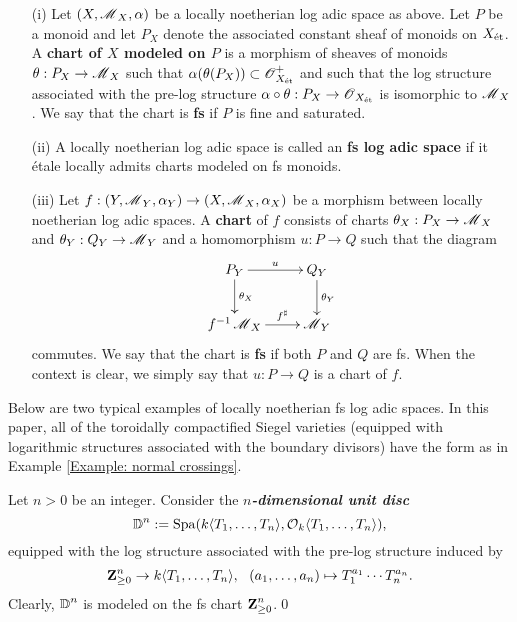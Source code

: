 \begin{Definition}
\begin{enumerate}
\item[(i)] Let $(X, \operatorname{\mathscr{M}}_{X}, \alpha)$ be a locally noetherian log adic space as above. Let $P$ be a monoid and let $P_{X}$ denote the associated constant sheaf of monoids on $X_{\operatorname{\textrm{\'{e}t}}}$. A \textbf{chart of $X$ modeled on $P$} is a morphism of sheaves of monoids $\theta: P_{X}\rightarrow \operatorname{\mathscr{M}}_{X}$ such that $\alpha(\theta(P_{X}))\subset \operatorname{\mathscr{O}}^+_{X_{\operatorname{\textrm{\'{e}t}}}}$ and such that the log structure associated with the pre-log structure $\alpha\circ\theta:P_{X}\rightarrow \operatorname{\mathscr{O}}_{X_{\operatorname{\textrm{\'{e}t}}}}$ is isomorphic to $\operatorname{\mathscr{M}}_{X}$. We say that the chart is \textbf{fs} if $P$ is fine and saturated. 
\item[(ii)] A locally noetherian log adic space is called an \textbf{fs log adic space} if it \'etale locally admits charts modeled on fs monoids.
\item[(iii)] Let $f: (Y, \operatorname{\mathscr{M}}_{Y}, \alpha_{Y})\rightarrow (X, \operatorname{\mathscr{M}}_{X}, \alpha_{X})$ be a morphism between locally noetherian log adic spaces. A \textbf{chart} of $f$ consists of charts $\theta_{X}:P_{X}\rightarrow \operatorname{\mathscr{M}}_{X}$ and $\theta_{Y}: Q_{Y}\rightarrow \operatorname{\mathscr{M}}_{Y}$ and a homomorphism $u:P\rightarrow Q$ such that the diagram
 \[
        \xymatrix{ {P_{Y}} \ar^-u[r] \ar^-{\theta_{X}}[d] & {Q_{Y}} \ar^-{\theta_{Y}}[d] \\
        {f^{-1}\scrM_{X}} \ar^-{f^\sharp}[r] & {\scrM_{Y}} }
    \]
commutes. We say that the chart is \textbf{fs} if both $P$ and $Q$ are fs. When the context is clear, we simply say that $u:P\rightarrow Q$ is a chart of $f$.
\end{enumerate}
\end{Definition}

Below are two typical examples of locally noetherian fs log adic spaces. In this paper, all of the toroidally compactified Siegel varieties (equipped with logarithmic structures associated with the boundary divisors) have the form as in Example \ref{Example: normal crossings}.

\begin{Example}\label{Example: unit disc}
\normalfont Let $n>0$ be an integer. Consider the \textit{\textbf{$n$-dimensional unit disc}}
\[\operatorname{\mathbb{D}}^n:=\operatorname{Spa}(k\langle T_1, \ldots, T_n\rangle, \operatorname{\mathcal{O}}_k\langle T_1, \ldots, T_n\rangle),\]
equipped with the log structure associated with the pre-log structure induced by \[\operatorname{\mathbf{Z}}^n_{\geq 0}\rightarrow k\langle T_1, \ldots, T_n\rangle,\,\,\,\, (a_1, \ldots, a_n)\mapsto T_1^{a_1}\cdots T_n^{a_n}.\] Clearly, $\operatorname{\mathbb{D}}^n$ is modeled on the fs chart $\operatorname{\mathbf{Z}}^n_{\geq 0}$.\qed
\end{Example}

